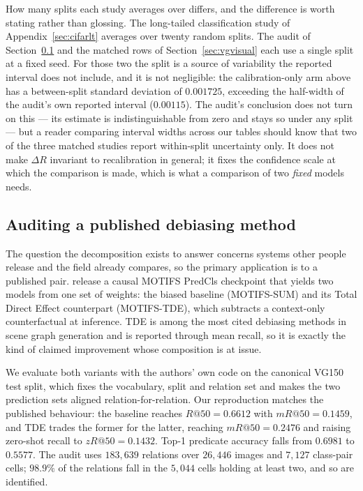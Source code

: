 How many splits each study averages over differs, and the difference is worth stating
rather than glossing. The long-tailed classification study of Appendix~\ref{sec:cifarlt}
averages over twenty random splits. The audit of Section~\ref{sec:sggaudit} and the
matched rows of Section~\ref{sec:vgvisual} each use a single split at a fixed seed. For
those two the split is a source of variability the reported interval does not include, and
it is not negligible: the calibration-only arm above has a between-split standard
deviation of $0.001725$, exceeding the half-width of the audit's own reported interval
($0.00115$). The audit's conclusion does not turn on this --- its estimate is
indistinguishable from zero and stays so under any split --- but a reader comparing
interval widths across our tables should know that two of the three matched studies report
within-split uncertainty only. It does not make $\Delta R$ invariant to recalibration in
general; it fixes the confidence scale at which the comparison is made, which is what a
comparison of two \emph{fixed} models needs.


\subsection{Auditing a published debiasing method}\label{sec:sggaudit}

The question the decomposition exists to answer concerns systems other people release and
the field already compares, so the primary application is to a published pair.
\citet{tang2020unbiased} release a causal MOTIFS PredCls checkpoint that yields two models
from one set of weights: the biased baseline (MOTIFS-SUM) and its Total Direct Effect
counterpart (MOTIFS-TDE), which subtracts a context-only counterfactual at inference. TDE is
among the most cited debiasing methods in scene graph generation and is reported through mean
recall, so it is exactly the kind of claimed improvement whose composition is at issue.

We evaluate both variants with the authors' own code on the canonical VG150 test split, which
fixes the vocabulary, split and relation set and makes the two prediction sets aligned
relation-for-relation. Our reproduction matches the published behaviour: the baseline reaches
$R@50=0.6612$ with $mR@50=0.1459$, and TDE trades the former for the latter, reaching
$mR@50=0.2476$ and raising zero-shot recall to $zR@50=0.1432$. Top-1 predicate accuracy falls
from $0.6981$ to $0.5577$. The audit uses $183{,}639$ relations over $26{,}446$ images and
$7{,}127$ class-pair cells; $98.9\%$ of the relations fall in the $5{,}044$ cells holding at
least two, and so are identified.

